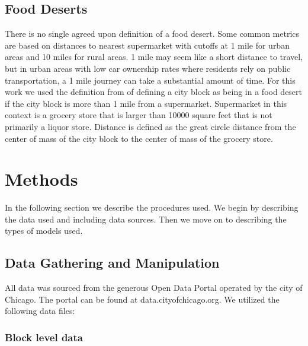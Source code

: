 \documentclass{report}
\begin{document}
\subsection*{Food Deserts}
There is no single agreed upon definition of a food desert. Some common metrics are based on distances to nearest supermarket with cutoffs at 1 mile for urban areas and 10 miles for rural areas. 1 mile may seem like a short distance to travel, but in urban areas with low car ownership rates where residents rely on public transportation, a 1 mile journey can take a substantial amount of time. 
For this work we used the definition from %
of defining a city block as being in a food desert if the city block is more than 1 mile from a supermarket. Supermarket in this context is a grocery store that is larger than 10000 square feet %
that is not primarily a liquor store. Distance is defined as the great circle distance from the center of mass of the city block to the center of mass of the grocery store. 


\section*{Methods}
In the following section we describe the procedures used. We begin by describing the data used and including data sources. Then we move on to describing the types of models used. 

\subsection*{Data Gathering and Manipulation}

All data was sourced from the generous Open Data Portal operated by the city of Chicago. The portal can be found at data.cityofchicago.org. We utilized the following data files:

\subsubsection*{Block level data}

\end{document}
